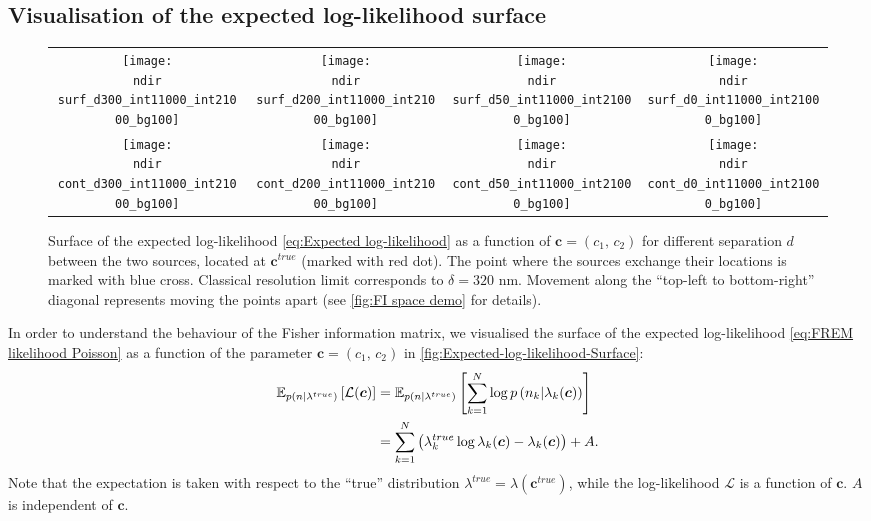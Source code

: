 \subsection{Visualisation of the expected log-likelihood surface\label{sub:LL surface}}
\begin{figure}[hbt!]
	\centering
	\newcommand{\sizeff}{.18}
	\newcommand{\sizegg}{.16}
	\newcommand{\ndir}{\qd gFREM/images/LLsurface/}
	\begin{tabular}{cccc}
		\subfloat[$d=300$ nm]{\texttt{[image: \\ndir surf\_d300\_int11000\_int21000\_bg100]}} 		
		& \subfloat[$d=200$ nm]{\texttt{[image: \\ndir surf\_d200\_int11000\_int21000\_bg100]}} 		
		& \subfloat[$d=50$ nm]{\texttt{[image: \\ndir surf\_d50\_int11000\_int21000\_bg100]}} 		
		& \subfloat[$d=0$ nm]{\texttt{[image: \\ndir surf\_d0\_int11000\_int21000\_bg100]}} 		
		\tabularnewline
		\subfloat[$d=300$ nm]{\texttt{[image: \\ndir cont\_d300\_int11000\_int21000\_bg100]}} 
		& \subfloat[$d=200$ nm]{\texttt{[image: \\ndir cont\_d200\_int11000\_int21000\_bg100]}} 		
		& \subfloat[$d=50$ nm]{\texttt{[image: \\ndir cont\_d50\_int11000\_int21000\_bg100]}} 		
		& \subfloat[$d=0$ nm]{\texttt{[image: \\ndir cont\_d0\_int11000\_int21000\_bg100]}} 		
		\tabularnewline
	\end{tabular}
	\caption{Surface of the expected log-likelihood \autoref{eq:Expected log-likelihood} as a function of $\bm{c}=(c_1,\, c_2)$ for different separation $d$ between the two sources, located at $\bm{c}^{true}$ (marked with red dot). The point where the sources exchange their locations is marked with blue cross. Classical resolution limit corresponds to $\delta=320$ nm. Movement along the ``top-left to bottom-right'' diagonal represents moving the points apart (see \autoref{fig:FI space demo} for details).}	
	\label{fig:Expected-log-likelihood-Surface}
\end{figure}

In order to understand the behaviour of the Fisher information matrix, we visualised the surface of the expected log-likelihood \autoref{eq:FREM likelihood Poisson} as a function of the parameter $\bm{c}=(c_1,\, c_2)$ in \autoref{fig:Expected-log-likelihood-Surface}:
%
\begin{alignat}{2}
	\mathbb{E}_{p(n|\lambda^{true})}\left[\mathcal{L}(\bm{c})\right]
	&=\mathbb{E}_{p(n|\lambda^{true})}\left[\sum_{k=1}^N\log p\left(n_k|\lambda_k(\bm{c})\right)\right]\nonumber\\
	&=\sum_{k=1}^N\left(\lambda_k^{true}\log\lambda_k(\bm{c})-\lambda_k(\bm{c})\right)+A.
	\label{eq:Expected log-likelihood}
\end{alignat}
%
Note that the expectation is taken with respect to the ``true'' distribution $\lambda^{true}=\lambda(\bm{c}^{true})$, while the log-likelihood $\mathcal{L}$ is a function of $\bm{c}$. $A$ is independent of $\bm{c}$. 

